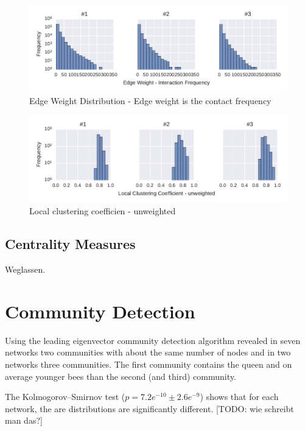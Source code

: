 \begin{figure}[htb]
	\centering
	\includegraphics[width=1.0\textwidth]{Figures/stat-edgeWeightDist}
	\caption[Edge Weight Distribution]{Edge Weight Distribution - Edge weight is the contact frequency}
	\label{fig:statEdgeWeightDist}
\end{figure}


\begin{figure}[htb]
	\centering
	\includegraphics[width=1.0\textwidth]{Figures/stat-lccDist}
	\caption[Local clustering coefficien]{Local clustering coefficien - unweighted}
	\label{fig:lccDist}
\end{figure}


\subsection{Centrality Measures}
Weglassen.



\section{Community Detection}

Using the leading eigenvector community detection algorithm revealed in seven networks two communities with about the same number of nodes and in two networks three communities. The first community contains the queen and on average younger bees than the second (and third) community.

The Kolmogorov–Smirnov  test ($p=7.2e^{-10} \pm2.6e^{-9}$) shows that for each network, the are distributions are significantly different. [TODO: wie schreibt man das?]

